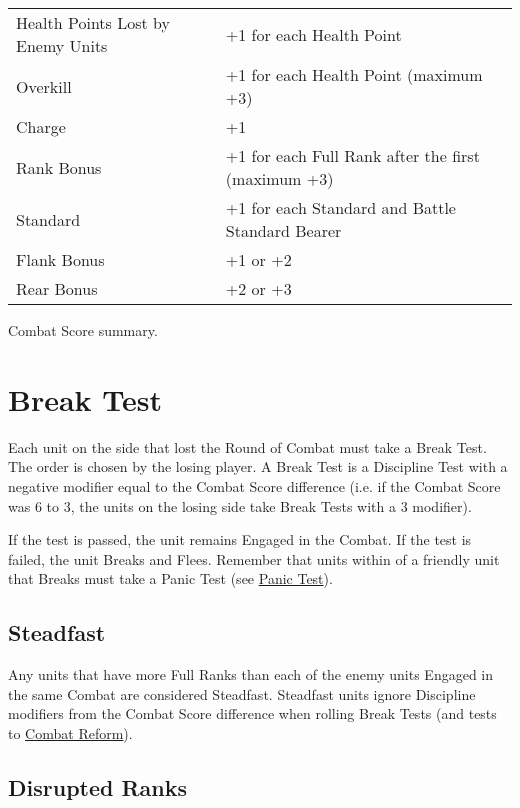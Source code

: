 \begin{Figure}
	\Tanchor
	\centering
	\begin{tabular}{>{\raggedleft}m{} m{} }
		\toprule
		Health Points Lost by Enemy Units & +1 for each Health Point\\
		Overkill & +1 for each Health Point (maximum +3)\\
		Charge & +1 \\
		Rank Bonus & +1 for each Full Rank after the first (maximum +3)\\
		Standard & +1 for each Standard and Battle Standard Bearer \\
		Flank Bonus & +1 or +2 \\
		Rear Bonus & +2 or +3\\
		\bottomrule
	\end{tabular}
	\caption{Combat Score summary.}
	\label{table/combat_score}
\end{Figure}

\section{Break Test}
\label{break_test}

Each unit on the side that lost the Round of Combat must take a Break Test. The order is chosen by the losing player. A Break Test is a Discipline Test with a negative modifier equal to the Combat Score difference (i.e. if the Combat Score was 6 to 3, the units on the losing side take Break Tests with a \minuss{}3 modifier).

If the test is passed, the unit remains Engaged in the Combat. If the test is failed, the unit Breaks and Flees. Remember that units within  of a friendly unit that Breaks must take a Panic Test (see \hyperref[panic_test]{Panic Test}).

\subsection{Steadfast}
\label{steadfast}

Any units that have more Full Ranks than each of the enemy units Engaged in the same Combat are considered Steadfast. Steadfast units ignore Discipline modifiers from the Combat Score difference when rolling Break Tests (and tests to \hyperref[combat_reform]{Combat Reform}).

\subsection{Disrupted Ranks}
\label{disrupted_ranks}


